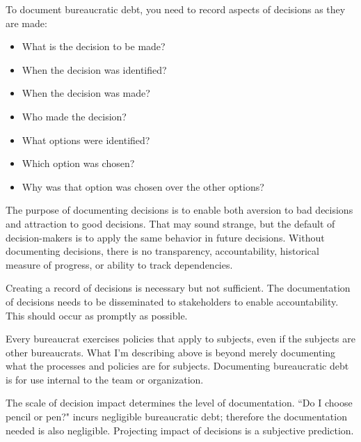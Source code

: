 To document bureaucratic debt, you need to record aspects of decisions as they are made:
\begin{itemize}
    \item What is the decision to be made?
    \item When the decision was identified?
    \item When the decision was made?
    \item Who made the decision?
    \item What options were identified?
    \item Which option was chosen?
    \item Why was that option was chosen over the other options?
\end{itemize}
The purpose of documenting decisions is to enable both aversion to bad decisions and attraction to good decisions. That may sound strange, but the default of decision-makers is to apply the same behavior in future decisions. 
Without documenting decisions, there is no transparency, accountability, historical measure of progress, or ability to track dependencies. 

Creating a record of decisions is necessary but not sufficient. The documentation of decisions needs to be disseminated to stakeholders to enable accountability. This should occur as promptly as possible. 

Every bureaucrat exercises policies that apply to subjects, even if the subjects are other bureaucrats. What I'm describing above is beyond merely documenting what the processes and policies are for subjects. Documenting bureaucratic debt is for use internal to the team or organization.  

The scale of decision impact determines the level of documentation. ``Do I choose pencil or pen?" incurs negligible bureaucratic debt; therefore the documentation needed is also negligible. Projecting impact of decisions is a subjective prediction. 


